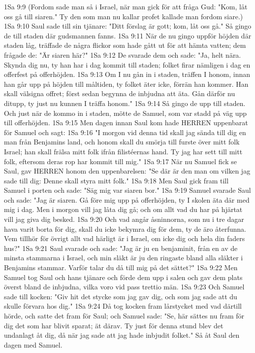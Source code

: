 1Sa 9:9  (Fordom sade man så i Israel, när man gick för att fråga Gud: "Kom, låt oss gå till siaren." Ty den som man nu kallar profet kallade man fordom siare.)
1Sa 9:10  Saul sade till sin tjänare: "Ditt förslag är gott; kom, låt oss gå." Så gingo de till staden där gudsmannen fanns.
1Sa 9:11  När de nu gingo uppför höjden där staden låg, träffade de några flickor som hade gått ut för att hämta vatten; dem frågade de: "Är siaren här?"
1Sa 9:12  De svarade dem och sade: "Ja, helt nära. Skynda dig nu, ty han har i dag kommit till staden; folket firar nämligen i dag en offerfest på offerhöjden.
1Sa 9:13  Om I nu gån in i staden, träffen I honom, innan han går upp på höjden till måltiden, ty folket äter icke, förrän han kommer. Han skall välsigna offret; först sedan begynna de inbjudna att äta. Gån därför nu ditupp, ty just nu kunnen I träffa honom."
1Sa 9:14  Så gingo de upp till staden. Och just när de kommo in i staden, mötte de Samuel, som var stadd på väg upp till offerhöjden.
1Sa 9:15  Men dagen innan Saul kom hade HERREN uppenbarat för Samuel och sagt:
1Sa 9:16  "I morgon vid denna tid skall jag sända till dig en man från Benjamins land, och honom skall du smörja till furste över mitt folk Israel; han skall frälsa mitt folk ifrån filistéernas hand. Ty jag har sett till mitt folk, eftersom deras rop har kommit till mig."
1Sa 9:17  När nu Samuel fick se Saul, gav HERREN honom den uppenbarelsen: "Se där är den man om vilken jag sade till dig: Denne skall styra mitt folk."
1Sa 9:18  Men Saul gick fram till Samuel i porten och sade: "Säg mig var siaren bor."
1Sa 9:19  Samuel svarade Saul och sade: "Jag är siaren. Gå före mig upp på offerhöjden, ty I skolen äta där med mig i dag. Men i morgon vill jag låta dig gå; och om allt vad du har på hjärtat vill jag giva dig besked.
1Sa 9:20  Och vad angår åsninnorna, som nu i tre dagar hava varit borta för dig, skall du icke bekymra dig för dem, ty de äro återfunna. Vem tillhör för övrigt allt vad härligt är i Israel, om icke dig och hela din faders hus?"
1Sa 9:21  Saul svarade och sade: "Jag är ju en benjaminit, från en av de minsta stammarna i Israel, och min släkt är ju den ringaste bland alla släkter i Benjamins stammar. Varför talar du då till mig på det sättet?"
1Sa 9:22  Men Samuel tog Saul och hans tjänare och förde dem upp i salen och gav dem plats överst bland de inbjudna, vilka voro vid pass trettio män.
1Sa 9:23  Och Samuel sade till kocken: "Giv hit det stycke som jag gav dig, och som jag sade att du skulle förvara hos dig."
1Sa 9:24  Då tog kocken fram lårstycket med vad därtill hörde, och satte det fram för Saul; och Samuel sade: "Se, här sättes nu fram för dig det som har blivit sparat; ät därav. Ty just för denna stund blev det undanlagt åt dig, då när jag sade att jag hade inbjudit folket." Så åt Saul den dagen med Samuel.
